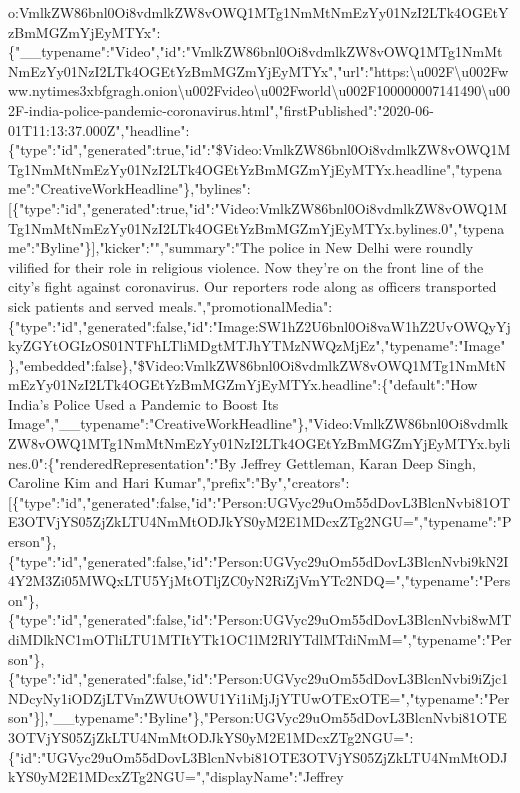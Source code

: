 o:VmlkZW86bnl0Oi8vdmlkZW8vOWQ1MTg1NmMtNmEzYy01NzI2LTk4OGEtYzBmMGZmYjEyMTYx":\{"\_\_typename":"Video","id":"VmlkZW86bnl0Oi8vdmlkZW8vOWQ1MTg1NmMtNmEzYy01NzI2LTk4OGEtYzBmMGZmYjEyMTYx","url":"https:\textbackslash{}u002F\textbackslash{}u002Fwww.nytimes3xbfgragh.onion\textbackslash{}u002Fvideo\textbackslash{}u002Fworld\textbackslash{}u002F100000007141490\textbackslash{}u002F-india-police-pandemic-coronavirus.html","firstPublished":"2020-06-01T11:13:37.000Z","headline":\{"type":"id","generated":true,"id":"\$Video:VmlkZW86bnl0Oi8vdmlkZW8vOWQ1MTg1NmMtNmEzYy01NzI2LTk4OGEtYzBmMGZmYjEyMTYx.headline","typename":"CreativeWorkHeadline"\},"bylines":{[}\{"type":"id","generated":true,"id":"Video:VmlkZW86bnl0Oi8vdmlkZW8vOWQ1MTg1NmMtNmEzYy01NzI2LTk4OGEtYzBmMGZmYjEyMTYx.bylines.0","typename":"Byline"\}{]},"kicker":"","summary":"The
police in New Delhi were roundly vilified for their role in religious
violence. Now they're on the front line of the city's fight against
coronavirus. Our reporters rode along as officers transported sick
patients and served
meals.","promotionalMedia":\{"type":"id","generated":false,"id":"Image:SW1hZ2U6bnl0Oi8vaW1hZ2UvOWQyYjkyZGYtOGIzOS01NTFhLTliMDgtMTJhYTMzNWQzMjEz","typename":"Image"\},"embedded":false\},"\$Video:VmlkZW86bnl0Oi8vdmlkZW8vOWQ1MTg1NmMtNmEzYy01NzI2LTk4OGEtYzBmMGZmYjEyMTYx.headline":\{"default":"How
India's Police Used a Pandemic to Boost Its
Image","\_\_typename":"CreativeWorkHeadline"\},"Video:VmlkZW86bnl0Oi8vdmlkZW8vOWQ1MTg1NmMtNmEzYy01NzI2LTk4OGEtYzBmMGZmYjEyMTYx.bylines.0":\{"renderedRepresentation":"By
Jeffrey Gettleman, Karan Deep Singh, Caroline Kim and Hari
Kumar","prefix":"By","creators":{[}\{"type":"id","generated":false,"id":"Person:UGVyc29uOm55dDovL3BlcnNvbi81OTE3OTVjYS05ZjZkLTU4NmMtODJkYS0yM2E1MDcxZTg2NGU=","typename":"Person"\},\{"type":"id","generated":false,"id":"Person:UGVyc29uOm55dDovL3BlcnNvbi9kN2I4Y2M3Zi05MWQxLTU5YjMtOTljZC0yN2RiZjVmYTc2NDQ=","typename":"Person"\},\{"type":"id","generated":false,"id":"Person:UGVyc29uOm55dDovL3BlcnNvbi8wMTdiMDlkNC1mOTliLTU1MTItYTk1OC1lM2RlYTdlMTdiNmM=","typename":"Person"\},\{"type":"id","generated":false,"id":"Person:UGVyc29uOm55dDovL3BlcnNvbi9iZjc1NDcyNy1iODZjLTVmZWUtOWU1Yi1iMjJjYTUwOTExOTE=","typename":"Person"\}{]},"\_\_typename":"Byline"\},"Person:UGVyc29uOm55dDovL3BlcnNvbi81OTE3OTVjYS05ZjZkLTU4NmMtODJkYS0yM2E1MDcxZTg2NGU=":\{"id":"UGVyc29uOm55dDovL3BlcnNvbi81OTE3OTVjYS05ZjZkLTU4NmMtODJkYS0yM2E1MDcxZTg2NGU=","displayName":"Jeffrey
